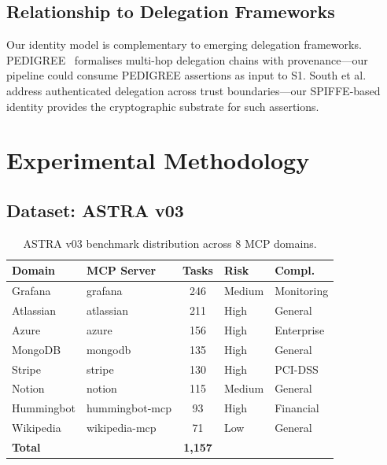 \documentclass[10pt,a4paper,twocolumn]{article}
\begin{document}
\subsection{Relationship to Delegation Frameworks}
\label{sec:delegation}

Our identity model is complementary to emerging delegation frameworks. PEDIGREE~\cite{rampalli2026pedigree} formalises multi-hop delegation chains with provenance---our pipeline could consume PEDIGREE assertions as input to S1. South et al.~\cite{south2025authenticated} address authenticated delegation across trust boundaries---our SPIFFE-based identity provides the cryptographic substrate for such assertions.

\section{Experimental Methodology}
\label{sec:methodology}

\subsection{Dataset: ASTRA v03}
\label{sec:dataset}

\begin{table}[!t]
\centering
\caption{ASTRA v03 benchmark distribution across 8 MCP domains.}
\label{tab:astra}
\scriptsize
\setlength{\tabcolsep}{3pt}
\begin{tabular}{@{}llcll@{}}
\toprule
\textbf{Domain} & \textbf{MCP Server} & \textbf{Tasks} & \textbf{Risk} & \textbf{Compl.} \\
\midrule
Grafana & grafana & 246 & Medium & Monitoring \\
Atlassian & atlassian & 211 & High & General \\
Azure & azure & 156 & High & Enterprise \\
MongoDB & mongodb & 135 & High & General \\
Stripe & stripe & 130 & High & PCI-DSS \\
Notion & notion & 115 & Medium & General \\
Hummingbot & hummingbot-mcp & 93 & High & Financial \\
Wikipedia & wikipedia-mcp & 71 & Low & General \\
\midrule
\textbf{Total} & & \textbf{1,157} & & \\
\bottomrule
\end{tabular}
\end{table}
\end{document}
